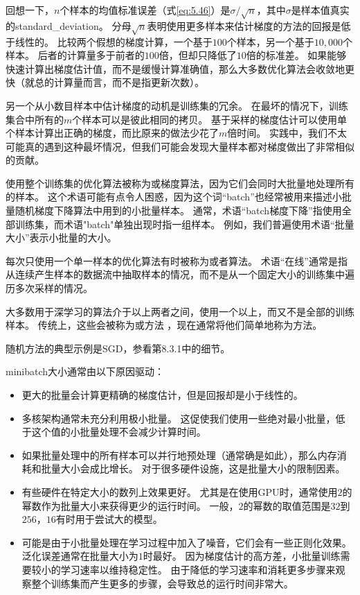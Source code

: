 回想一下，$n$个样本的均值标准误差（式\ref{eq:5.46}）是$\sigma/\sqrt{n}$，其中$\sigma$是样本值真实的\gls{standard_deviation}。
分母$\sqrt{n}$表明使用更多样本来估计梯度的方法的回报是低于线性的。
比较两个假想的梯度计算，一个基于$100$个样本，另一个基于$10,000$个样本。
后者的计算量多于前者的$100$倍，但却只降低了$10$倍的标准差。
如果能够快速计算出梯度估计值，而不是缓慢计算准确值，那么大多数优化算法会收敛地更快（就总的计算量而言，而不是指更新次数）。

另一个从小数目样本中估计梯度的动机是训练集的冗余。
在最坏的情况下，训练集合中所有的$m$个样本可以是彼此相同的拷贝。
基于采样的梯度估计可以使用单个样本计算出正确的梯度，而比原来的做法少花了$m$倍时间。
实践中，我们不太可能真的遇到这种最坏情况，但我们可能会发现大量样本都对梯度做出了非常相似的贡献。

使用整个训练集的优化算法被称为或梯度算法，因为它们会同时大批量地处理所有的样本。
这个术语可能有点令人困惑，因为这个词``\gls{batch}''也经常被用来描述小批量随机梯度下降算法中用到的小批量样本。
通常，术语``\gls{batch}梯度下降''指使用全部训练集，而术语"\gls{batch}"单独出现时指一组样本。
例如，我们普遍使用术语``批量大小''表示小批量的大小。

每次只使用一个单一样本的优化算法有时被称为或者算法。
术语``在线''通常是指从连续产生样本的数据流中抽取样本的情况，而不是从一个固定大小的训练集中遍历多次采样的情况。


大多数用于深学习的算法介于以上两者之间，使用一个以上，而又不是全部的训练样本。
传统上，这些会被称为或方法 ，现在通常将他们简单地称为方法。

随机方法的典型示例是\gls{SGD}，参看第8.3.1中的细节。

\gls{minibatch}大小通常由以下原因驱动：
\begin{itemize}
    \item 更大的批量会计算更精确的梯度估计，但是回报却是小于线性的。
    
    \item 多核架构通常未充分利用极小批量。
    这促使我们使用一些绝对最小批量，低于这个值的小批量处理不会减少计算时间。
    
    \item 如果批量处理中的所有样本可以并行地预处理（通常确是如此），那么内存消耗和批量大小会成比增长。
    对于很多硬件设施，这是批量大小的限制因素。
    
    \item 有些硬件在特定大小的数列上效果更好。
    尤其是在使用GPU时，通常使用$2$的幂数作为批量大小来获得更少的运行时间。
    一般，$2$的幂数的取值范围是$32$到$256$，$16$有时用于尝试大的模型。
    
    \item 
    可能是由于小批量处理在学习过程中加入了噪音，它们会有一些正则化效果\citep{Wilson-2003}。
    泛化误差通常在批量大小为$1$时最好。
    因为梯度估计的高方差，小批量训练需要较小的学习速率以维持稳定性。
    由于降低的学习速率和消耗更多步骤来观察整个训练集而产生更多的步骤，会导致总的运行时间非常大。
\end{itemize}

